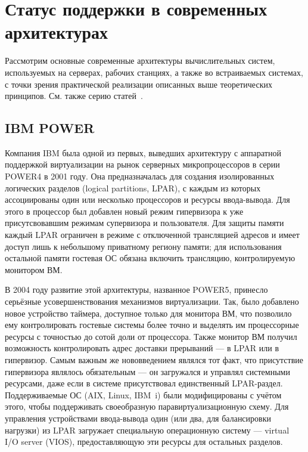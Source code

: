 \section{Статус поддержки в современных архитектурах}

Рассмотрим основные современные архитектуры вычислительных систем, используемых на серверах, рабочих станциях, а также во встраиваемых системах, с точки зрения практической реализации описанных выше теоретических принципов. См. также серию статей~\cite{mpr-03-05-07-01,mpr-03-12-07-01,mpr-03-26-07-01}.

\subsection{IBM POWER}

Компания IBM была одной из первых, выведших архитектуру с аппаратной поддержкой виртуализации на рынок серверных микропроцессоров в серии POWER4 в 2001 году. Она предназначалась для создания изолированных логических разделов (\abbr logical partitions, LPAR), с каждым из которых ассоциированы один или несколько процессоров и ресурсы ввода-вывода. Для этого в процессор был добавлен новый режим гипервизора к уже присутсвовавшим режимам супервизора и пользователя. Для защиты памяти каждый LPAR ограничен в режиме с отключенной трансляцией адресов и имеет доступ лишь к небольшому приватному региону памяти; для использования остальной памяти гостевая ОС обязана включить трансляцию, контролируемую монитором ВМ.

В 2004 году развитие этой архитектуры, названное POWER5, принесло серьёзные усовершенствования механизмов виртуализации. Так, было добавлено новое устройство таймера, доступное только для монитора ВМ, что позволило ему контролировать гостевые системы более точно и выделять им процессорные ресурсы с точностью до сотой доли от процессора. Также монитор ВМ получил возможность контролировать адрес доставки прерываний --- в LPAR или в гипервизор. Самым важным же нововведением являлся тот факт, что присутствие гипервизора являлось обязательным --- он загружался и управлял системными ресурсами, даже если в системе присутствовал единственный LPAR-раздел. Поддерживаемые ОС (AIX, Linux, IBM~i) были модифицированы с учётом этого, чтобы поддерживать своеобразную паравиртуализационную схему. Для управления устройствами ввода-вывода один (или два, для балансировки нагрузки) из LPAR загружает специальную операционную систему --- virtual I/O server (VIOS), предоставляющую эти ресурсы для остальных разделов.

